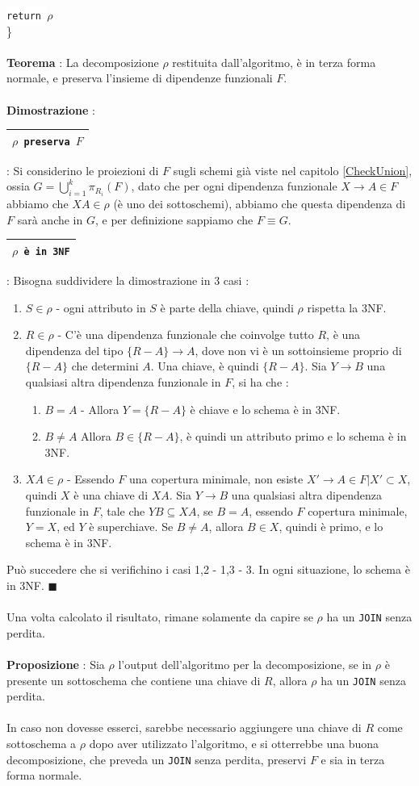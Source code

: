 \documentclass[12pt, letterpaper]{article}
\newcommand{\codee}[1]{\colorbox{white}{\texttt{#1}}}
\newcommand{\acc}{\\\hphantom{}\\}
\newcommand{\boxedMath}[1]{\begin{tabular}{|c|}\hline \texttt{#1} \\ \hline\end{tabular} :}
\begin{document}
\hphantom{ident}\hphantom{ident} \codee{return }\(\rho\)\\
\hphantom{ident}\}\acc 
\textbf{Teorema} : La decomposizione \(\rho\) restituita dall'algoritmo, è in terza forma normale, e preserva l'insieme 
di dipendenze funzionali \(F\).\acc 
\textbf{Dimostrazione} : \boxedMath{\(\rho\) preserva \(F\)} Si considerino le proiezioni di \(F\) sugli schemi 
già viste nel capitolo \ref{CheckUnion}, ossia \(G=\displaystyle\bigcup^k_{i=1}\pi_{R_i}(F)\), dato che per ogni dipendenza 
funzionale \(X\rightarrow A\in F\) abbiamo che \(XA\in\rho\) (è uno dei sottoschemi), abbiamo che questa dipendenza di \(F\) 
sarà anche in \(G\), e per definizione sappiamo che \(F\equiv G\).\\\boxedMath{\(\rho\) è in 3NF} Bisogna suddividere la dimostrazione in 3 casi :\begin{enumerate}
    \item \(S\in \rho\) - ogni attributo in \(S\) è parte della chiave, quindi \(\rho\) rispetta la 3NF.
    \item \(R\in \rho\) - C'è una dipendenza funzionale che coinvolge tutto \(R\), è una dipendenza 
    del tipo \(\{R-A\}\rightarrow A\), dove non vi è un sottoinsieme proprio di \(\{R-A\}\) che determini \(A\). Una chiave, 
    è quindi \(\{R-A\}\). Sia \(Y\rightarrow B\) una qualsiasi altra dipendenza funzionale in \(F\), si ha che :\begin{enumerate}
        \item \(B=A\) - Allora \(Y=\{R-A\}\) è chiave e lo schema è in 3NF.
        \item \(B\ne A\) Allora \(B\in \{R-A\}\), è quindi un attributo primo e lo schema è in 3NF.
    \end{enumerate}
    \item \(XA\in \rho\) - Essendo \(F\) una copertura minimale, non esiste \(X'\rightarrow A\in F|X'\subset X\), quindi 
    \(X\) è una chiave di \(XA\). Sia \(Y\rightarrow B\) una qualsiasi altra dipendenza funzionale in \(F\), tale che 
    \(YB\subseteq XA\), se \(B=A\), essendo \(F\) copertura minimale, \(Y=X\), ed \(Y\) è superchiave. Se \(B\ne A\), allora 
    \(B\in X\), quindi è primo, e lo schema è in 3NF.
\end{enumerate}
Può succedere che si verifichino i casi 1,2 - 1,3 - 3. In ogni situazione, lo schema è in 3NF. \(\blacksquare\)\acc
Una volta calcolato il risultato, rimane solamente da capire se \(\rho\) ha un \codee{JOIN} senza perdita.\acc 
\textbf{Proposizione }: Sia \(\rho\) l'output dell'algoritmo per la decomposizione, se in \(\rho\) è presente un sottoschema 
che contiene una chiave di \(R\), allora \(\rho\) ha un  \codee{JOIN} senza perdita.\acc 
In caso non dovesse esserci, sarebbe necessario aggiungere una chiave di \(R\) come sottoschema a \(\rho\) dopo aver 
utilizzato l'algoritmo, e si otterrebbe una buona decomposizione, che preveda 
un \codee{JOIN} senza perdita, preservi \(F\) e sia in terza forma normale.
\end{document}
